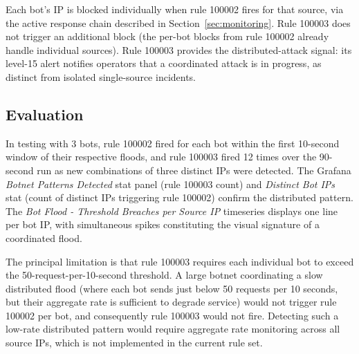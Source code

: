 Each bot's IP is blocked individually when rule 100002 fires for that source, via
the active response chain described in Section~\ref{sec:monitoring}. Rule 100003
does not trigger an additional block (the per-bot blocks from rule 100002
already handle individual sources). Rule 100003 provides the distributed-attack
signal: its level-15 alert notifies operators that a coordinated attack is in
progress, as distinct from isolated single-source incidents.

\subsection{Evaluation}

In testing with 3 bots, rule 100002 fired for each bot within the first
10-second window of their respective floods, and rule 100003 fired 12 times over
the 90-second run as new combinations of three distinct IPs were detected. The
Grafana \emph{Botnet Patterns Detected} stat panel (rule 100003 count) and
\emph{Distinct Bot IPs} stat (count of distinct IPs triggering rule 100002)
confirm the distributed pattern. The \emph{Bot Flood - Threshold Breaches per
Source IP} timeseries displays one line per bot IP, with simultaneous spikes
constituting the visual signature of a coordinated flood.

The principal limitation is that rule 100003 requires each individual bot to
exceed the 50-request-per-10-second threshold. A large botnet coordinating a
slow distributed flood (where each bot sends just below 50 requests per 10
seconds, but their aggregate rate is sufficient to degrade service) would not
trigger rule 100002 per bot, and consequently rule 100003 would not fire.
Detecting such a low-rate distributed pattern would require aggregate rate
monitoring across all source IPs, which is not implemented in the current rule
set.
